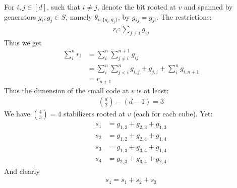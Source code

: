   For $i,j \in [d]$, such that $i \neq j$, denote the bit rooted at $v$ and spanned by generators $g_{i}, g_{j} \in S$, namely $\theta_{v,\{ g_{i},g_{j} \}}$, by $g_{ij} = g_{ji}$. The restrictions: 
  \begin{equation*}
    \begin{split}
      r_{i} \colon \sum_{j\neq i} g_{ij}
    \end{split}
  \end{equation*}
  Thus we get
  \begin{equation*}
    \begin{split}
      \sum_{i}^{n}r_{i} & = \sum_{i}^{n} \sum_{j \neq i }^{n+1} g_{ij} \\
      & =   \sum_{i}^{n}\sum_{j < i}^{n} g_{i,j} + g_{j,i} +   \sum_{i}^{n}  g_{i,n+1} \\
      & = r_{n+1}
    \end{split}
  \end{equation*}
  Thus the dimension of the small code at $v$ is at least: 
  \begin{equation*}
    \begin{split}
      { d \choose 2 } - (d-1) = 3 
    \end{split}
  \end{equation*}
  We have $ { 4 \choose 3 } = 4 $ stabilizers rooted at $v$ (each for each cube). Yet:  
  \begin{equation*}
    \begin{split}
      s_{1} &= g_{1,2} + g_{2,3} + g_{1,3} \\
      s_{2} &= g_{1,2} + g_{2,4} + g_{1,4} \\
      s_{3} &= g_{1,3} + g_{3,4} + g_{1,4} \\
      s_{4} &= g_{2,3} + g_{3,4} + g_{2,4} 
    \end{split}
  \end{equation*}
  And clearly 
  \begin{equation*}
    \begin{split}
      s_{4} = s_{1}+s_{2}+s_{3}
    \end{split}
  \end{equation*}

\begin{definition}
  
\end{definition}


